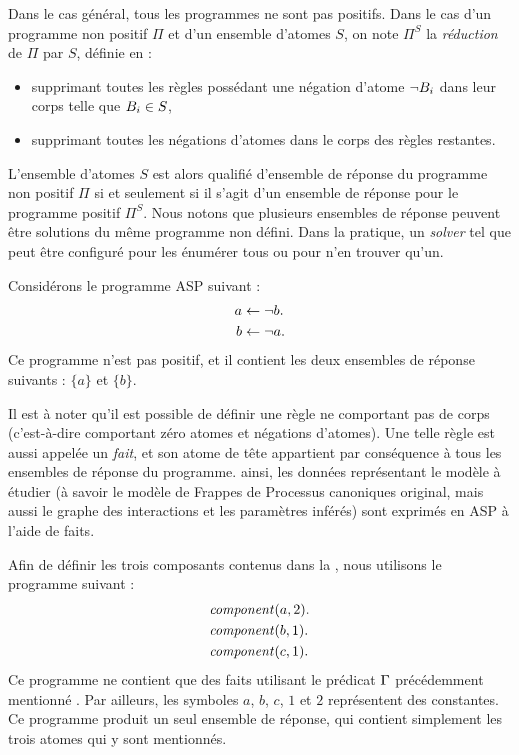 Dans le cas général, tous les programmes ne sont pas positifs.
Dans le cas d'un programme non positif $\Pi$ et d'un ensemble d'atomes $S$,
on note $\Pi^S$ la \emph{réduction} de $\Pi$ par $S$, définie en :
\begin{itemize}
  \item supprimant toutes les règles possédant une négation d'atome $\neg B_i$
    dans leur corps telle que $B_i \in S$,
  \item supprimant toutes les négations d'atomes dans le corps des règles restantes.
\end{itemize}
L'ensemble d'atomes $S$ est alors qualifié d'ensemble de réponse du programme non positif
$\Pi$ si et seulement si il s'agit d'un ensemble de réponse pour le programme positif $\Pi^S$.
Nous notons que plusieurs ensembles de réponse peuvent être solutions du même programme
non défini.
Dans la pratique, un \textit{solver} tel que  peut être configuré pour
les énumérer tous ou pour n'en trouver qu'un.

\begin{example}
  Considérons le programme ASP suivant :
 \begin{align*}
   a &\leftarrow \neg b.\\
   b &\leftarrow \neg a.
 \end{align*}
 Ce programme n'est pas positif, et il contient les deux ensembles de réponse suivants :
 $\{a\}$ et $\{b\}$.
\end{example}

Il est à noter qu'il est possible de définir une règle ne comportant pas de corps
(c'est-à-dire comportant zéro atomes et négations d'atomes).
Une telle règle est aussi appelée un \emph{fait},
et son atome de tête appartient par conséquence à tous les ensembles de réponse
du programme.
ainsi, les données représentant le modèle à étudier
(à savoir le modèle de Frappes de Processus canoniques original,
mais aussi le graphe des interactions et les paramètres inférés)
sont exprimés en ASP à l'aide de faits.

\begin{example}
  Afin de définir les trois composants contenus dans la ,
  nous utilisons le programme suivant :
  \begin{align*}
    &\mathit{component}(a, 2). \\
    &\mathit{component}(b, 1). \\
    &\mathit{component}(c, 1).
  \end{align*}
  Ce programme ne contient que des faits utilisant le prédicat $\mathrm{\Gamma}$
  précédemment mentionné .
  Par ailleurs, les symboles $a$, $b$, $c$, $1$ et $2$ représentent des constantes.
  Ce programme produit un seul ensemble de réponse,
  qui contient simplement les trois atomes qui y sont mentionnés.
\end{example}



